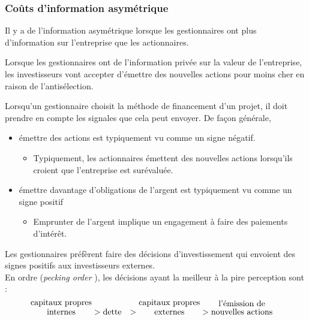 \documentclass[10pt, french]{article}
\begin{document}
\begin{multicols*}{2}
\columnbreak
\subsubsection{Coûts d'information asymétrique}
\begin{definitionNOHFILL}
Il y a de l'information asymétrique lorsque les gestionnaires ont plus d'information sur l'entreprise que les actionnaires.
\end{definitionNOHFILL}

\begin{definitionNOHFILLsub}
Lorsque les gestionnaires ont de l'information privée sur la valeur de l'entreprise, les investisseurs vont accepter d'émettre des nouvelles actions pour moins cher en raison de l'antisélection.
\end{definitionNOHFILLsub}

Lorsqu'un gestionnaire choisit la méthode de financement d'un projet, il doit prendre en compte les signales que cela peut envoyer. De façon générale, 
\begin{itemize}
	\item	émettre des actions est typiquement vu comme un signe négatif.
		\begin{itemize}
		\item	Typiquement, les actionnaires émettent des nouvelles actions lorsqu'ils croient que l'entreprise est surévaluée. 
		\end{itemize}
	\item	émettre davantage d'obligations de l'argent est typiquement vu comme un signe positif
		\begin{itemize}
		\item	Emprunter de l'argent implique un engagement à faire des paiements d'intérêt.
		\end{itemize}
\end{itemize}

\begin{definitionNOHFILL}
Les gestionnaires préfèrent faire des décisions d'investissement qui envoient des signes positifs aux investisseurs externes.\\

En ordre (\og \textit{pecking order} \fg{}), les décisions ayant la meilleur à la pire perception sont :
\begin{align*}
	\shortstack{capitaux propres\\ internes}	
	&>	
	\shortstack{dette}	
	&>	
	\shortstack{capitaux propres\\ externes}	
	&>	
	\shortstack{l'émission de\\ nouvelles actions}
\end{align*}
\end{definitionNOHFILL}



\end{multicols*}
\end{document}

